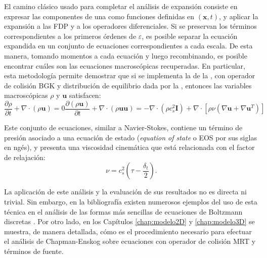 El camino cl\'asico usado para completar el an\'alisis de expansi\'on consiste en expresar las componentes de una \lbe{} como funciones definidas en $(\bm{x},t)$, y aplicar la expansi\'on a las FDP y a los operadores diferenciales. Si se preservan los t\'erminos correspondientes a los primeros \'ordenes de $\varepsilon$, es posible separar la ecuaci\'on expandida en un conjunto de ecuaciones correspondientes a cada escala. De esta manera, tomando momentos a cada ecuaci\'on y luego recombinando, es posible encontrar cu\'ales son las ecuaciones macrosc\'opicas recuperadas. En particular, esta metodolog\'ia permite demostrar que si se implementa la \lbe{} de la , con operador de colisi\'on BGK y distribuci\'on de equilibrio dada por la , entonces las variables macrosc\'opicas $\rho$ y $\bm{u}$ satisfacen:
\begin{subequations}
	\begin{equation}
		\dfrac{\partial \rho}{\partial t}  + \nabla \cdot (\rho \bm{u})=0
	\end{equation}
	\begin{equation}
	\dfrac{\partial (\rho \bm{u})}{\partial t}  + \nabla \cdot (\rho \bm{u}\bm{u})=-\nabla \cdot (\rho c_s^2 \bm{I}) + \nabla \cdot [\rho \nu (\nabla \bm{u}+\nabla \bm{u}^T)]
	\end{equation}
\end{subequations}

Este conjunto de ecuaciones, similar a Navier-Stokes, contiene un t\'ermino de presi\'on asociado a una ecuaci\'on de estado (\emph{equation of state} o EOS por sus siglas en ng\'es), y presenta una viscosidad cinem\'atica que est\'a relacionada con el factor de relajaci\'on:
\begin{equation}
	\nu = c_s^2 \left( \tau - \dfrac{\delta_t}{2} \right).
\end{equation}

La aplicaci\'on de este an\'alisis y la evaluaci\'on de sus resultados no es directa ni trivial. Sin embargo, en la bibliograf\'ia existen numerosos ejemplos del uso de esta t\'ecnica en el an\'alisis de las formas m\'as sencillas de ecuaciones de Boltzmann discretas \cite{kruger_lattice_2017, succi_lattice_2001, succi_lattice_2018, guo_lattice_2013}. Por otro lado, en los Cap\'itulos \ref{chap:modelo2D} y \ref{chap:modelo3D} se muestra, de manera detallada, c\'omo es el procedimiento necesario para efectuar el an\'alisis de Chapman-Enskog sobre ecuaciones con operador de colisi\'on MRT y t\'erminos de fuente.

